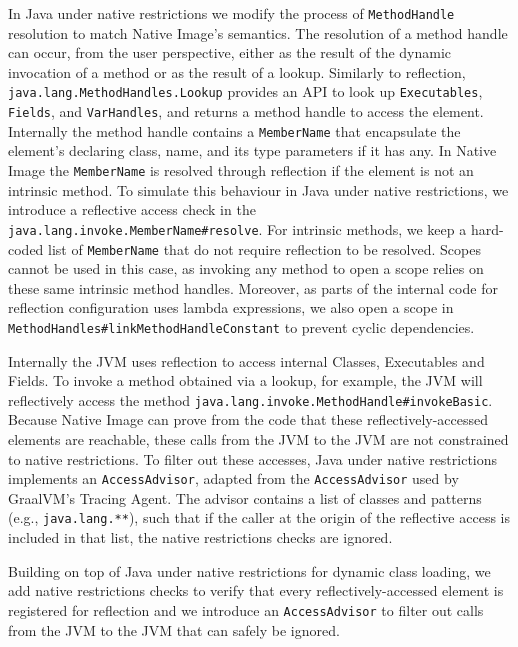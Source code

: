 In Java under native restrictions we modify the process of \verb|MethodHandle| resolution to match Native Image's semantics.
The resolution of a method handle can occur, from the user perspective, either as the result of the dynamic invocation of a method or as the result of a lookup.
Similarly to reflection, \verb|java.lang.MethodHandles.Lookup| provides an API to look up \verb|Executables|, \verb|Fields|, and \verb|VarHandles|, and returns a method handle to access the element. Internally the method handle contains a \verb|MemberName| that encapsulate the element's declaring class, name, and its type parameters if it has any. 
In Native Image the \verb|MemberName| is resolved through reflection if the element is not an intrinsic method. To simulate this behaviour in Java under native restrictions, we introduce a reflective access check in the \verb|java.lang.invoke.MemberName#resolve|. 
For intrinsic methods, we keep a hard-coded list of \verb|MemberName| that do not require reflection to be resolved. Scopes cannot be used in this case, as invoking any method to open a scope relies on these same intrinsic method handles.
Moreover, as parts of the internal code for reflection configuration uses lambda expressions, we also open a scope in \verb|MethodHandles#linkMethodHandleConstant| to prevent cyclic dependencies.

Internally  the JVM uses reflection to access internal Classes, Executables and Fields. To invoke a method obtained via a lookup, for example, the JVM will reflectively access the method \verb|java.lang.invoke.MethodHandle#invokeBasic|. Because Native Image can prove from the code that these reflectively-accessed elements are reachable, these calls from the JVM to the JVM are not constrained to native restrictions. To filter out these accesses, Java under native restrictions implements an \verb|AccessAdvisor|, adapted from the \verb|AccessAdvisor| used by GraalVM's Tracing Agent. The advisor contains a list of classes and patterns (e.g., \verb|java.lang.**|), such that if the caller at the origin of the reflective access is included in that list, the native restrictions checks are ignored.

Building on top of Java under native restrictions for dynamic class loading, we add native restrictions checks to verify that every reflectively-accessed element is registered for reflection and we introduce an \verb|AccessAdvisor| to filter out calls from the JVM to the JVM that can safely be ignored.

